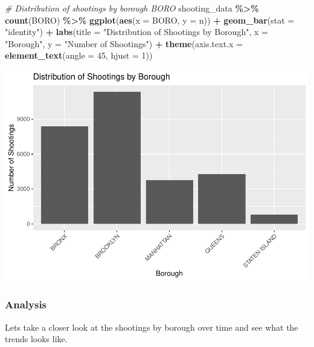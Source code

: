 \documentclass[
]{article}
\newenvironment{Shaded}{\begin{snugshade}}{\end{snugshade}}
\newcommand{\AttributeTok}[1]{\textcolor[rgb]{0.13,0.29,0.53}{#1}}
\newcommand{\CommentTok}[1]{\textcolor[rgb]{0.56,0.35,0.01}{\textit{#1}}}
\newcommand{\DecValTok}[1]{\textcolor[rgb]{0.00,0.00,0.81}{#1}}
\newcommand{\FunctionTok}[1]{\textcolor[rgb]{0.13,0.29,0.53}{\textbf{#1}}}
\newcommand{\NormalTok}[1]{#1}
\newcommand{\SpecialCharTok}[1]{\textcolor[rgb]{0.81,0.36,0.00}{\textbf{#1}}}
\newcommand{\StringTok}[1]{\textcolor[rgb]{0.31,0.60,0.02}{#1}}
\begin{document}
\begin{Shaded}
\begin{Highlighting}[]
\CommentTok{\# Distribution of shootings by borough BORO}
\NormalTok{shooting\_data }\SpecialCharTok{\%\textgreater{}\%}
  \FunctionTok{count}\NormalTok{(BORO) }\SpecialCharTok{\%\textgreater{}\%}
  \FunctionTok{ggplot}\NormalTok{(}\FunctionTok{aes}\NormalTok{(}\AttributeTok{x =}\NormalTok{ BORO, }\AttributeTok{y =}\NormalTok{ n)) }\SpecialCharTok{+}
  \FunctionTok{geom\_bar}\NormalTok{(}\AttributeTok{stat =} \StringTok{"identity"}\NormalTok{) }\SpecialCharTok{+}
  \FunctionTok{labs}\NormalTok{(}\AttributeTok{title =} \StringTok{"Distribution of Shootings by Borough"}\NormalTok{,}
       \AttributeTok{x =} \StringTok{"Borough"}\NormalTok{,}
       \AttributeTok{y =} \StringTok{"Number of Shootings"}\NormalTok{)  }\SpecialCharTok{+}
  \FunctionTok{theme}\NormalTok{(}\AttributeTok{axis.text.x =} \FunctionTok{element\_text}\NormalTok{(}\AttributeTok{angle =} \DecValTok{45}\NormalTok{, }\AttributeTok{hjust =} \DecValTok{1}\NormalTok{))}
\end{Highlighting}
\end{Shaded}

\includegraphics{nypd-shooting-data-analysis_files/figure-latex/distributions-4.pdf}

\subsubsection{Analysis}\label{analysis}

Lets take a closer look at the shootings by borough over time and see
what the trends looks like.
\end{document}
